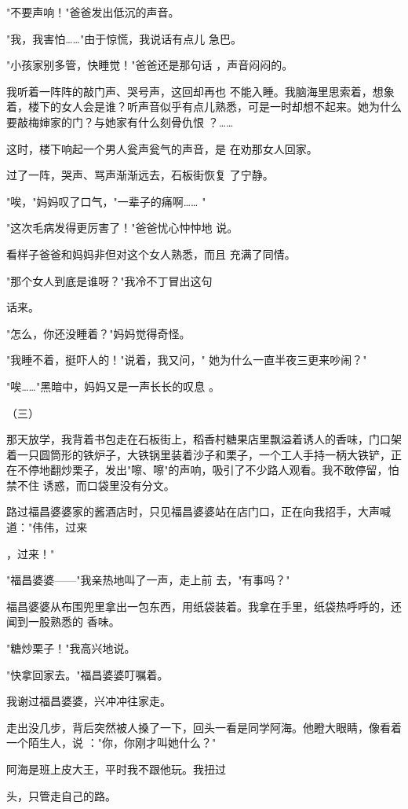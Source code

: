 \documentclass{article}
\begin{document}
"不要声响！"爸爸发出低沉的声音。 

"我，我害怕……"由于惊慌，我说话有点儿
急巴。 

"小孩家别多管，快睡觉！"爸爸还是那句话
，声音闷闷的。 

我听着一阵阵的敲门声、哭号声，这回却再也
\newpage
不能入睡。我脑海里思索着，想象着，楼下的女人会是谁？听声音似乎有点儿熟悉，可是一时却想不起来。她为什么要敲梅婶家的门？与她家有什么刻骨仇恨
？…… 

这时，楼下响起一个男人瓮声瓮气的声音，是
在劝那女人回家。 

过了一阵，哭声、骂声渐渐远去，石板街恢复
了宁静。 

"唉，"妈妈叹了口气，"一辈子的痛啊……
" 

"这次毛病发得更厉害了！"爸爸忧心忡忡地
说。 

看样子爸爸和妈妈非但对这个女人熟悉，而且
充满了同情。 

"那个女人到底是谁呀？"我冷不丁冒出这句
\newpage

话来。 


"怎么，你还没睡着？"妈妈觉得奇怪。 

"我睡不着，挺吓人的！"说着，我又问，"
她为什么一直半夜三更来吵闹？" 

"唉……"黑暗中，妈妈又是一声长长的叹息
。 


（三） 

那天放学，我背着书包走在石板街上，稻香村糖果店里飘溢着诱人的香味，门口架着一只圆筒形的铁炉子，大铁锅里装着沙子和栗子，一个工人手持一柄大铁铲，正在不停地翻炒栗子，发出"嚓、嚓"的声响，吸引了不少路人观看。我不敢停留，怕禁不住
诱惑，而口袋里没有分文。 

路过福昌婆婆家的酱酒店时，只见福昌婆婆站在店门口，正在向我招手，大声喊道："伟伟，过来
\newpage

，过来！" 

"福昌婆婆——"我亲热地叫了一声，走上前
去，"有事吗？" 

福昌婆婆从布围兜里拿出一包东西，用纸袋装着。我拿在手里，纸袋热呼呼的，还闻到一股熟悉的
香味。 


"糖炒栗子！"我高兴地说。 


"快拿回家去。"福昌婆婆叮嘱着。 


我谢过福昌婆婆，兴冲冲往家走。 

走出没几步，背后突然被人搡了一下，回头一看是同学阿海。他瞪大眼睛，像看着一个陌生人，说
："你，你刚才叫她什么？" 

阿海是班上皮大王，平时我不跟他玩。我扭过

\newpage
头，只管走自己的路。 
\end{document}
